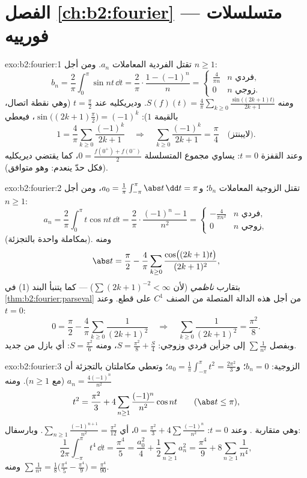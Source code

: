 \section*{الفصل \ref{ch:b2:fourier} --- متسلسلات فورييه}

\begin{solution}{exo:b2:fourier:1}
تقتل الفردية المعاملات $a_n$. ومن أجل $n \geq 1$:
\[
b_n = \frac{2}{\pi}\int_0^{\pi} \sin nt\,\dd t
= \frac{2}{\pi}\cdot\frac{1 - (-1)^n}{n}
= \begin{cases} \frac{4}{\pi n} & n \text{ فردي},\\ 0 & n
\text{ زوجي}. \end{cases}
\]
ومنه $S(f)(t) = \frac{4}{\pi}\sum_{k\geq0} \frac{\sin\bigl((2k+1)t
\bigr)}{2k+1}$. وديريكليه عند $t = \frac\pi2$ (وهي نقطة اتصال،
بالقيمة $1$): $\sin\bigl((2k+1)\frac\pi2\bigr) = (-1)^k$، فيعطي
\[
1 = \frac4\pi \sum_{k\geq0}\frac{(-1)^k}{2k+1}
\quad\Longrightarrow\quad
\sum_{k\geq0}\frac{(-1)^k}{2k+1} = \frac{\pi}{4}
\quad\text{(لايبنتز)}.
\]
وعند القفزة $t = 0$: يساوي مجموع المتسلسلة $0 = \frac{f(0^+) +
f(0^-)}{2}$، كما يقتضي ديريكليه (فكل حدّ ينعدم:
وهو متوافق).
\end{solution}

\begin{solution}{exo:b2:fourier:2}
تقتل الزوجية المعاملات $b_n$؛ و$a_0 = \frac{1}{\pi}\int_{-\pi}^\pi\abs
t\,\dd t = \pi$، ومن أجل $n \geq 1$:
\[
a_n = \frac{2}{\pi}\int_0^\pi t\cos nt\,\dd t
= \frac{2}{\pi}\cdot\frac{(-1)^n - 1}{n^2}
= \begin{cases} -\frac{4}{\pi n^2} & n \text{ فردي},\\ 0 & n
\text{ زوجي}, \end{cases}
\]
(بمكاملة واحدة بالتجزئة). ومنه
\[
\abs t = \frac{\pi}{2} - \frac{4}{\pi}\sum_{k\geq0}
\frac{\cos\bigl((2k+1)t\bigr)}{(2k+1)^2} ,
\]
بتقارب \emph{ناظمي} (لأن $\sum (2k+1)^{-2} < \infty$) --- كما
يتنبأ البند (1) في \cref{thm:b2:fourier:parseval} من أجل هذه الدالة المتصلة
من الصنف $C^1$ على قطع. وعند $t = 0$:
\[
0 = \frac\pi2 - \frac4\pi\sum_{k\geq0}\frac{1}{(2k+1)^2}
\quad\Longrightarrow\quad
\sum_{k\geq0}\frac{1}{(2k+1)^2} = \frac{\pi^2}{8} .
\]
وبفصل $\sum \frac{1}{n^2}$ إلى جزأين فردي وزوجي: $S =
\frac{\pi^2}{8} + \frac S4$، ومنه $S = \frac{\pi^2}{6}$: أي بازل من جديد.
\end{solution}

\begin{solution}{exo:b2:fourier:3}
الزوجية: $b_n = 0$؛ و$a_0 = \frac{1}{\pi}\int_{-\pi}^{\pi} t^2 =
\frac{2\pi^2}{3}$؛ وتعطي مكاملتان بالتجزئة أن $a_n =
\frac{4(-1)^n}{n^2}$ (مع $n \geq 1$). ومنه
\[
t^2 = \frac{\pi^2}{3} + 4\sum_{n\geq1}
\frac{(-1)^n}{n^2}\cos nt
\qquad (\abs t \leq \pi),
\]
وهي متقاربة . وعند $t = 0$: $0 = \frac{\pi^2}{3} +
4\sum\frac{(-1)^n}{n^2}$، أي $\sum_{n\geq1}
\frac{(-1)^{n+1}}{n^2} = \frac{\pi^2}{12}$. وبارسفال:
\[
\frac{1}{2\pi}\int_{-\pi}^{\pi} t^4\,\dd t = \frac{\pi^4}{5}
= \frac{a_0^2}{4} + \frac12\sum_{n\geq1} a_n^2
= \frac{\pi^4}{9} + 8\sum_{n\geq1}\frac{1}{n^4} ,
\]
ومنه $\sum \frac{1}{n^4} = \frac18\bigl(\frac{\pi^4}{5} -
\frac{\pi^4}{9}\bigr) = \frac{\pi^4}{90}$.
\end{solution}

